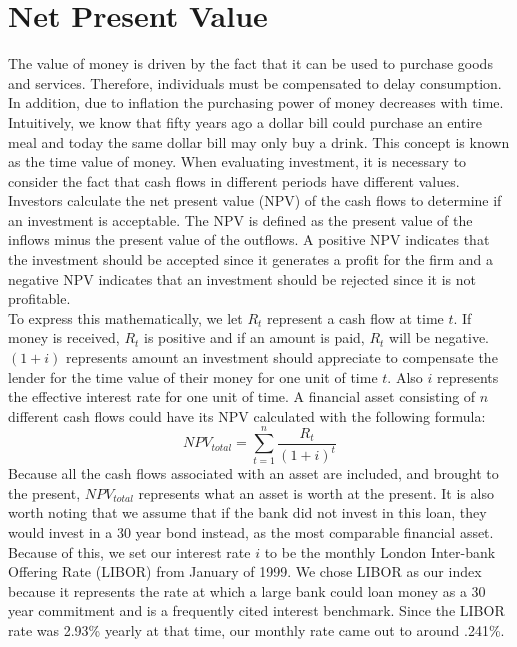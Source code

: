\documentclass[12 pt]{uncw_thesis}
\theoremstyle{plain}
\theoremstyle{remark}
\theoremstyle{definition}
\begin{document}
\section{Net Present Value}
The value of money is driven by the fact that it can be used to purchase goods and services. Therefore, individuals must be compensated to delay consumption. In addition, due to inflation the purchasing power of money decreases with time. Intuitively, we know that fifty years ago a dollar bill could purchase an entire meal and today the same dollar bill may only buy a drink. This concept is known as the time value of money. When evaluating investment, it is necessary to consider the fact that cash flows in different periods have different values.  Investors calculate the net present value (NPV) of the cash flows to determine if an investment is acceptable. The NPV is defined as the present value of the inflows minus the present value of the outflows. A positive NPV indicates that the investment should be accepted since it generates a profit for the firm and a negative NPV indicates that an investment should be rejected since it is not profitable.\\ 
To express this mathematically, we let \(R_t\) represent a cash flow at time \(t\). If money is received, \(R_t\) is positive and if an amount is paid, \(R_t\) will be negative. \((1+i)\) represents amount an investment should appreciate to compensate the lender for the time value of their money for one unit of time \(t\). Also \(i\) represents the effective interest rate for one unit of time. A financial asset consisting of $n$ different cash flows could have its NPV calculated with the following formula:  
\[NPV_{total} = \sum_{t=1}^n \frac{R_t}{(1+i)^t}\]
Because all the cash flows associated with an asset are included, and brought to the present, \(NPV_{total}\) represents what an asset is worth at the present. It is also worth noting that we assume that if the bank did not invest in this loan, they would invest in a 30 year bond instead, as the most comparable financial asset. Because of this, we set our interest rate \(i\) to be the monthly London Inter-bank Offering Rate (LIBOR) from January of 1999. We chose LIBOR as our index because it represents the rate at which a large bank could loan money as a 30 year commitment and is a frequently cited interest benchmark. Since the LIBOR rate was 2.93\% yearly at that time, our monthly rate came out to around .241\%.
\end{document}
